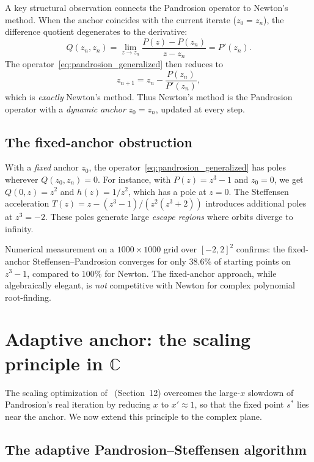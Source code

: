 \documentclass[11pt,a4paper]{article}
\theoremstyle{definition}
\newcommand{\CC}{\mathbb{C}}
\begin{document}
A key structural observation connects the Pandrosion operator to Newton's method.  When the anchor coincides with the current iterate ($z_0 = z_n$), the difference quotient degenerates to the derivative:
\[
  Q(z_n, z_n) = \lim_{z \to z_n} \frac{P(z) - P(z_n)}{z - z_n} = P'(z_n).
\]
The operator~\eqref{eq:pandrosion_generalized} then reduces to
\[
  z_{n+1} = z_n - \frac{P(z_n)}{P'(z_n)},
\]
which is \emph{exactly} Newton's method.  Thus Newton's method is the Pandrosion operator with a \emph{dynamic anchor} $z_0 = z_n$, updated at every step.

\subsection{The fixed-anchor obstruction}

With a \emph{fixed} anchor $z_0$, the operator~\eqref{eq:pandrosion_generalized} has poles wherever $Q(z_0, z_n) = 0$.  For instance, with $P(z) = z^3 - 1$ and $z_0 = 0$, we get $Q(0,z) = z^2$ and $h(z) = 1/z^2$, which has a pole at $z = 0$.  The Steffensen acceleration $T(z) = z - (z^3-1)/(z^2(z^3+2))$ introduces additional poles at $z^3 = -2$.  These poles generate large \emph{escape regions} where orbits diverge to infinity.

Numerical measurement on a $1000 \times 1000$ grid over $[-2,2]^2$ confirms: the fixed-anchor Steffensen--Pandrosion converges for only $38.6\%$ of starting points on $z^3 - 1$, compared to $100\%$ for Newton.  The fixed-anchor approach, while algebraically elegant, is \emph{not} competitive with Newton for complex polynomial root-finding.

\section{Adaptive anchor: the scaling principle in $\CC$}
\label{sec:adaptive}

The scaling optimization of~\cite{besevic2026} (Section~12) overcomes the large-$x$ slowdown of Pandrosion's real iteration by reducing $x$ to $x' \approx 1$, so that the fixed point $s^*$ lies near the anchor.  We now extend this principle to the complex plane.

\subsection{The adaptive Pandrosion--Steffensen algorithm}
\end{document}
